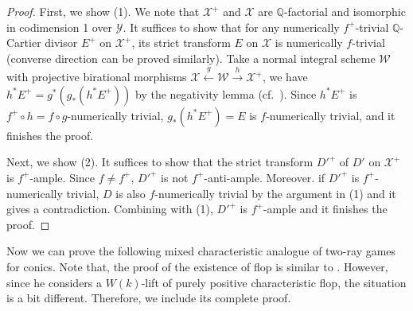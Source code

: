 \documentclass[autodetect-engine, a4paper]{amsart}
\theoremstyle{definition}
\def\Q{{\mathbb Q}}
\begin{document}
\begin{proof}
First, we show (1). We note that $\mathcal{X}^{+}$ and $\mathcal{X}$ are $\Q$-factorial and isomorphic in codimension 1 over $\mathcal{Y}$.
It suffices to show that for any numerically $f^{+}$-trivial $\Q$-Cartier divisor $E^{+}$ on $\mathcal{X}^{+}$, its strict transform $E$ on $\mathcal{X}$ is numerically $f$-trivial
(converse direction can be proved similarly).
Take a normal integral scheme $\mathcal{W}$ with projective birational morphisms $\mathcal{X} \xleftarrow{g} \mathcal{W} \xrightarrow{h} \mathcal{X}^{+}$, we have $h^{\ast} E^{+} = g^{\ast} (g_{\ast} (h^{\ast} E^{+}))$  by the negativity lemma (cf.\ \cite[Lemma 2.14]{BMPSTWW}).
Since $h^{\ast} E^{+}$ is $f^{+}\circ h = f \circ g$-numerically trivial, $g_{\ast} (h^{\ast} E^{+}) = E$ is $f$-numerically trivial, and it finishes the proof.

Next, we show (2).
It suffices to show that the strict transform $D'^{+}$ of $D'$ on $\mathcal{X}^{+}$ is $f^{+}$-ample.
Since $f \neq f^{+}$, $D'^{+}$ is not $f^{+}$-anti-ample.
Moreover. if $D'^{+}$ is $f^{+}$-numerically trivial, $D$ is also $f$-numerically trivial by the argument in (1) and it gives a contradiction.
Combining with (1), $D'^{+}$ is $f^{+}$-ample and it finishes the proof.
\end{proof}


Now we can prove the following mixed characteristic analogue of two-ray games for conics.
Note that, the proof of the existence of flop is similar to \cite[Proposition 10.7]{Tanaka2}. However, since he considers a $W(k)$-lift of purely positive characteristic flop, the situation is a bit different.
Therefore, we include its complete proof.
\end{document}
